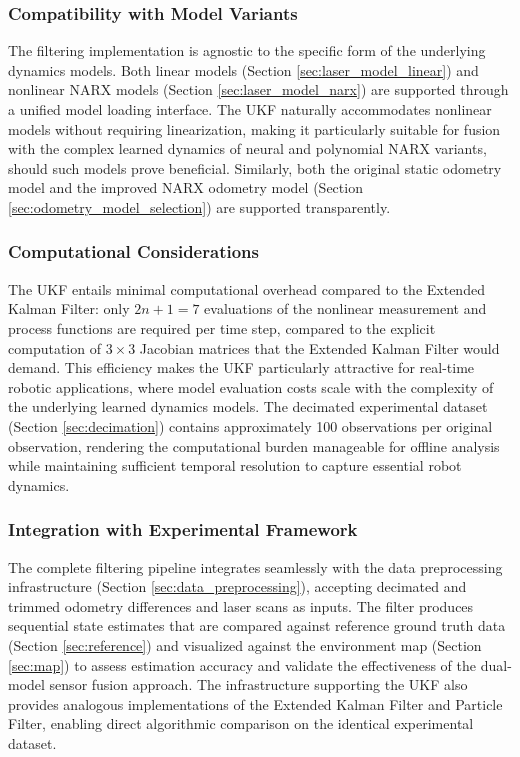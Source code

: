 \documentclass[conference]{IEEEtran}
\begin{document}
\subsubsection{Compatibility with Model Variants}

The filtering implementation is agnostic to the specific form of the underlying dynamics models. Both linear models (Section \ref{sec:laser_model_linear}) and nonlinear NARX models (Section \ref{sec:laser_model_narx}) are supported through a unified model loading interface. The UKF naturally accommodates nonlinear models without requiring linearization, making it particularly suitable for fusion with the complex learned dynamics of neural and polynomial NARX variants, should such models prove beneficial. Similarly, both the original static odometry model and the improved NARX odometry model (Section \ref{sec:odometry_model_selection}) are supported transparently.

\subsubsection{Computational Considerations}

The UKF entails minimal computational overhead compared to the Extended Kalman Filter: only $2n + 1 = 7$ evaluations of the nonlinear measurement and process functions are required per time step, compared to the explicit computation of $3 \times 3$ Jacobian matrices that the Extended Kalman Filter would demand. This efficiency makes the UKF particularly attractive for real-time robotic applications, where model evaluation costs scale with the complexity of the underlying learned dynamics models. The decimated experimental dataset (Section \ref{sec:decimation}) contains approximately 100 observations per original observation, rendering the computational burden manageable for offline analysis while maintaining sufficient temporal resolution to capture essential robot dynamics.

\subsubsection{Integration with Experimental Framework}

The complete filtering pipeline integrates seamlessly with the data preprocessing infrastructure (Section \ref{sec:data_preprocessing}), accepting decimated and trimmed odometry differences and laser scans as inputs. The filter produces sequential state estimates that are compared against reference ground truth data (Section \ref{sec:reference}) and visualized against the environment map (Section \ref{sec:map}) to assess estimation accuracy and validate the effectiveness of the dual-model sensor fusion approach. The infrastructure supporting the UKF also provides analogous implementations of the Extended Kalman Filter and Particle Filter, enabling direct algorithmic comparison on the identical experimental dataset.
\end{document}
